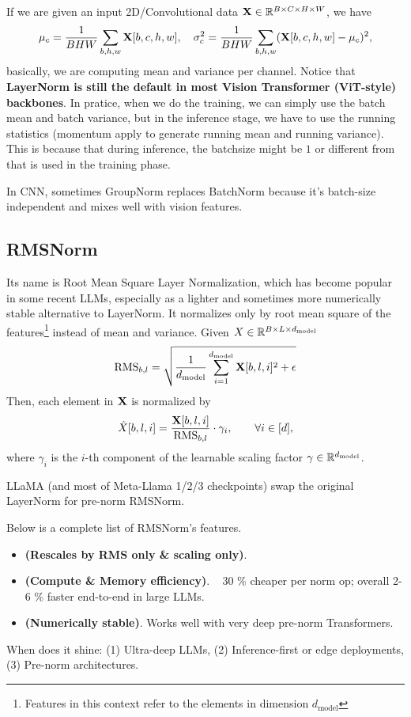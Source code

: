 \documentclass[11pt]{article}  %
\begin{document}
If we are given an input 2D/Convolutional data $\mathbf{X} \in \mathbb{R}^{B \times C \times H \times W}$, we have 
\begin{align*}
  \mu_c = \frac{1}{BHW}\sum_{b,h,w}\mathbf{X}[b, c, h, w], \quad \sigma_c^2 = \frac{1}{BHW}\sum_{b,h,w}(\mathbf{X}[b, c, h, w] - \mu_c)^2,
\end{align*}
basically, we are computing mean and variance per channel.
Notice that \textbf{LayerNorm is still the default in most Vision Transformer (ViT-style) backbones}. 
In pratice, when we do the training, we can simply use the batch mean and batch variance, but in the inference stage, we have to use the running statistics (momentum apply to generate running mean and running variance).
This is because that during inference, the batchsize might be $1$ or different from that is used in the training phase.

In CNN, sometimes GroupNorm replaces BatchNorm because it's batch-size independent and mixes well with vision features.


\subsection{RMSNorm}
Its name is Root Mean Square Layer Normalization, which has become popular in some recent LLMs, especially as a lighter and sometimes more numerically stable alternative to LayerNorm.
It normalizes only by root mean square of the features\footnote{Features in this context refer to the elements in dimension $d_{\text{model}}$} instead of mean and variance.
Given $X \in \mathbb{R}^{B \times L \times d_{\text{model}}}$ 
\begin{align*}
  \text{RMS}_{b, l} = \sqrt{\frac{1}{d_{\text{model}}}\sum_{i=1}^{d_{\text{model}}} \mathbf{X}[b, l, i]^2 + \epsilon}
\end{align*}
Then, each element in $\mathbf{X}$ is normalized by 
\begin{align*}
  \hat{X}[b, l, i] = \frac{\mathbf{X}[b, l, i]}{\text{RMS}_{b, l}} \cdot \gamma_i, \qquad \forall i \in [d],
\end{align*}
where $\gamma_i$ is the $i$-th component of the learnable scaling factor $\gamma \in \mathbb{R}^{d_{\text{model}}}$.

LLaMA (and most of Meta-Llama 1/2/3 checkpoints) swap the original LayerNorm for pre-norm RMSNorm.

Below is a complete list of RMSNorm's features.
\begin{itemize}
  \item {\bf (Rescales by RMS only \& scaling only)}.
  \item {\bf (Compute \& Memory efficiency)}. ~ 30 \% cheaper per norm op; overall 2-6 \% faster end-to-end in large LLMs.
  \item {\bf (Numerically stable)}. Works well with very deep pre-norm Transformers.
\end{itemize}
When does it shine: (1) Ultra-deep LLMs, (2) Inference-first or edge deployments, (3) Pre-norm architectures.
\end{document}
